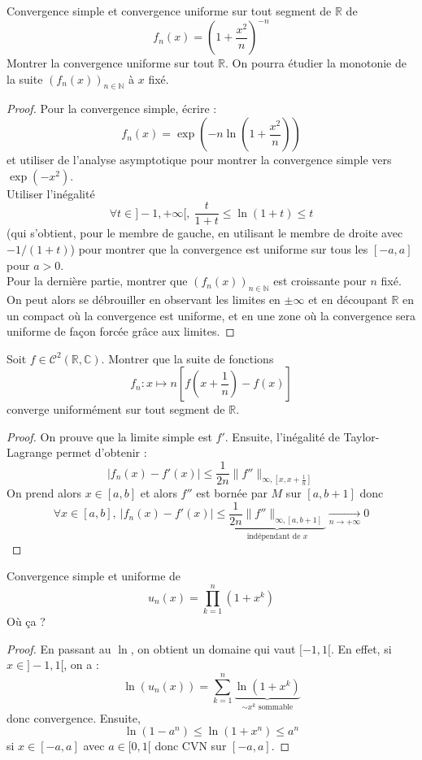 \documentclass[french,a4paper]{article}
\newcommand{\N}{\mathbb{N}}
\newcommand{\R}{\mathbb{R}}
\newcommand{\C}{\mathbb{C}}
\theoremstyle{plain}
\theoremstyle{definition}
\theoremstyle{remark}
\begin{document}
\begin{ex}{}
	Convergence simple et convergence uniforme sur tout segment de $\R$ de $$f_n(x)=\displaystyle\left(1+\frac{x^2}{n}\right)^{-n}$$Montrer la convergence uniforme sur tout $\R$. On pourra étudier la monotonie de la suite $(f_n(x))_{n\in\N}$ à $x$ fixé.
\end{ex}
\begin{proof}
	Pour la convergence simple, écrire : $$f_n(x)=\exp\left(-n\ln\left(1+\frac{x^2}{n}\right)\right)$$ et utiliser de l'analyse asymptotique pour montrer la convergence simple vers $\exp(-x^2)$. \\ Utiliser l'inégalité $$\forall t\in]-1,+\infty[,\ \frac{t}{1+t}\leqslant\ln(1+t)\leqslant t$$(qui s'obtient, pour le membre de gauche, en utilisant le membre de droite avec $-1/(1+t)$) pour montrer que la convergence est uniforme sur tous les $[-a,a]$ pour $a>0$. \\
	Pour la dernière partie, montrer que $(f_n(x))_{n\in\N}$ est croissante pour $n$ fixé. On peut alors se débrouiller en observant les limites en $\pm\infty$ et en découpant $\R$ en un compact où la convergence est uniforme, et en une zone où la convergence sera uniforme de façon forcée grâce aux limites.
\end{proof}

\begin{ex}{}
	Soit $f\in\mathcal{C}^2(\R,\C)$. Montrer que la suite de fonctions $$f_n:x\mapsto n\left[f\left(x+\frac{1}{n}\right)-f(x)\right]$$ converge uniformément sur tout segment de $\R$.
\end{ex}
\begin{proof}
	On prouve que la limite simple est $f'$. Ensuite, l'inégalité de Taylor-Lagrange permet d'obtenir : $$\lvert f_n(x)-f'(x)\rvert\leqslant\frac{1}{2n}\lVert f''\rVert_{\infty,\left[x,x+\frac{1}{n}\right]}$$ On prend alors $x\in[a,b]$ et alors $f''$ est bornée par $M$ sur $[a,b+1]$ donc $$\forall x\in[a,b],\ \lvert f_n(x)-f'(x)\rvert\leqslant\underbrace{\frac{1}{2n}\lVert f''\rVert_{\infty,\left[a,b+1\right]}}_{\text{indépendant de }x}\xrightarrow[n\to+\infty]{}0$$
\end{proof}

\begin{ex}{}
	Convergence simple et uniforme de $$u_n(x)=\prod_{k=1}^{n}(1+x^k)$$ Où ça ?
\end{ex}
\begin{proof}
	En passant au $\ln$, on obtient un domaine qui vaut $[-1,1[$. En effet, si $x\in]-1,1[$, on a : $$\ln(u_n(x))=\sum_{k=1}^{n}\underbrace{\ln(1+x^k)}_{\sim x^k\text{ sommable}}$$ donc convergence. Ensuite, $$\ln(1-a^n)\leqslant\ln(1+x^n)\leqslant a^n$$ si $x\in[-a,a]$ avec $a\in[0,1[$ donc CVN sur $[-a,a]$.
\end{proof}
\end{document}

